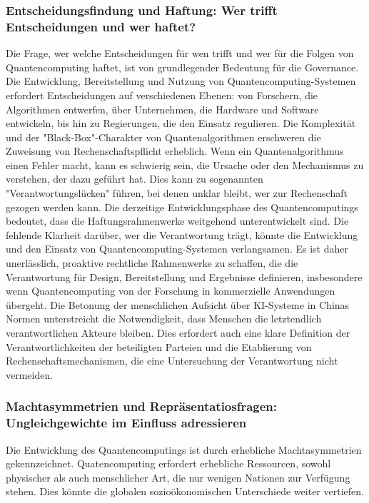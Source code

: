 \subsubsection{Entscheidungsfindung und Haftung: Wer trifft Entscheidungen und wer haftet?}
Die Frage, wer welche Entscheidungen für wen trifft und wer für die Folgen von Quantencomputing haftet, ist von grundlegender Bedeutung für die Governance. Die Entwicklung, Bereitstellung und Nutzung von Quantencomputing-Systemen erfordert Entscheidungen auf verschiedenen Ebenen: von Forschern, die Algorithmen entwerfen, über Unternehmen, die Hardware und Software entwickeln, bis hin zu Regierungen, die den Einsatz regulieren. Die Komplexität und der "Black-Box"-Charakter von Quantenalgorithmen erschweren die Zuweisung von Rechenschaftspflicht erheblich.\cite{noauthor_quantum_nodate-2}
Wenn ein Quantenalgorithmus einen Fehler macht, kann es schwierig sein, die Ursache oder den Mechanismus zu verstehen, der dazu geführt hat.\cite{noauthor_ethics_nodate-1}
Dies kann zu sogenannten "Verantwortungslücken" führen, bei denen unklar bleibt, wer zur Rechenschaft gezogen werden kann.
Die derzeitige Entwicklungsphase des Quantencomputings bedeutet, dass die Haftungsrahmenwerke weitgehend unterentwickelt sind. Die fehlende Klarheit darüber, wer die Verantwortung trägt, könnte die Entwicklung und den Einsatz von Quantencomputing-Systemen verlangsamen. Es ist daher unerlässlich, proaktive rechtliche Rahmenwerke zu schaffen, die die Verantwortung für Design, Bereitstellung und Ergebnisse definieren, insbesondere wenn Quantencomputing von der Forschung in kommerzielle Anwendungen übergeht. Die Betonung der menschlichen Aufsicht über KI-Systeme in Chinas Normen unterstreicht die Notwendigkeit, dass Menschen die letztendlich verantwortlichen Akteure bleiben. Dies erfordert auch eine klare Definition der Verantwortlichkeiten der beteiligten Parteien und die Etablierung von Rechenschaftsmechanismen, die eine Untersuchung der Verantwortung nicht vermeiden.\cite{noauthor_ethical_nodate} 

\subsubsection{Machtasymmetrien und Repräsentatiosfragen: Ungleichgewichte im Einfluss adressieren}
Die Entwicklung des Quantencomputings ist durch erhebliche Machtasymmetrien gekennzeichnet. Quatencomputing erfordert erhebliche Ressourcen, sowohl physischer als auch menschlicher Art, die nur wenigen Nationen zur Verfügung stehen. Dies könnte die globalen sozioökonomischen Unterschiede weiter vertiefen.\cite{noauthor_quantum_nodate-2}

